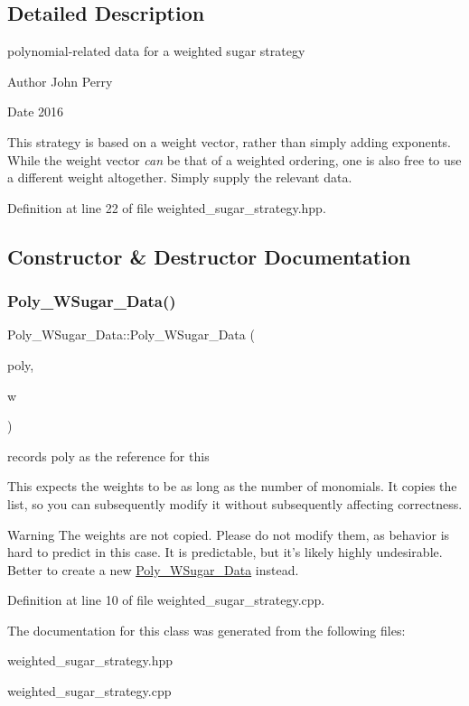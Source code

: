 \subsection{Detailed Description}
polynomial-\/related data for a weighted sugar strategy 

\begin{DoxyAuthor}{Author}
John Perry 
\end{DoxyAuthor}
\begin{DoxyDate}{Date}
2016
\end{DoxyDate}
This strategy is based on a weight vector, rather than simply adding exponents. While the weight vector {\itshape can} be that of a weighted ordering, one is also free to use a different weight altogether. Simply supply the relevant data. 

Definition at line 22 of file weighted\+\_\+sugar\+\_\+strategy.\+hpp.



\subsection{Constructor \& Destructor Documentation}
\mbox{\label{class_poly___w_sugar___data_a685c420830b3c050866a4675b4c1d749}} 
\subsubsection{\texorpdfstring{Poly\+\_\+\+W\+Sugar\+\_\+\+Data()}{Poly\_WSugar\_Data()}}
{\footnotesize\ttfamily Poly\+\_\+\+W\+Sugar\+\_\+\+Data\+::\+Poly\+\_\+\+W\+Sugar\+\_\+\+Data (\begin{DoxyParamCaption}\item[{const \hyperlink{class_abstract___polynomial}{Abstract\+\_\+\+Polynomial} $\ast$}]{poly,  }\item[{const W\+T\+\_\+\+T\+Y\+PE $\ast$}]{w }\end{DoxyParamCaption})}



records {\ttfamily poly} as the reference for {\ttfamily this} 

This expects the weights to be as long as the number of monomials. It copies the list, so you can subsequently modify it without subsequently affecting correctness. \begin{DoxyWarning}{Warning}
The weights are not copied. Please do not modify them, as behavior is hard to predict in this case. It is predictable, but it's likely highly undesirable. Better to create a new \hyperlink{class_poly___w_sugar___data}{Poly\+\_\+\+W\+Sugar\+\_\+\+Data} instead. 
\end{DoxyWarning}


Definition at line 10 of file weighted\+\_\+sugar\+\_\+strategy.\+cpp.



The documentation for this class was generated from the following files\+:\begin{DoxyCompactItemize}
\item 
weighted\+\_\+sugar\+\_\+strategy.\+hpp\item 
weighted\+\_\+sugar\+\_\+strategy.\+cpp\end{DoxyCompactItemize}
